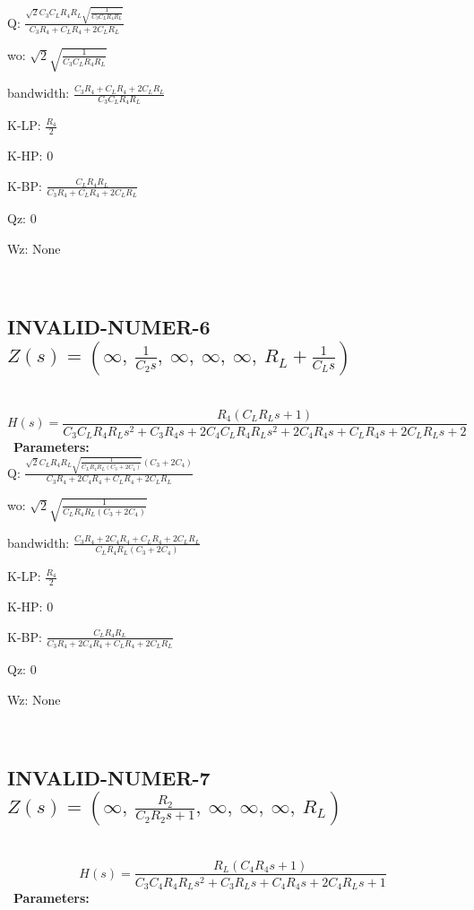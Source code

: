 \documentclass{article}
\begin{document}
Q: $\frac{\sqrt{2} C_{3} C_{L} R_{4} R_{L} \sqrt{\frac{1}{C_{3} C_{L} R_{4} R_{L}}}}{C_{3} R_{4} + C_{L} R_{4} + 2 C_{L} R_{L}}$\ 

wo: $\sqrt{2} \sqrt{\frac{1}{C_{3} C_{L} R_{4} R_{L}}}$\ 

bandwidth: $\frac{C_{3} R_{4} + C_{L} R_{4} + 2 C_{L} R_{L}}{C_{3} C_{L} R_{4} R_{L}}$\ 

K-LP: $\frac{R_{4}}{2}$\ 

K-HP: $0$\ 

K-BP: $\frac{C_{L} R_{4} R_{L}}{C_{3} R_{4} + C_{L} R_{4} + 2 C_{L} R_{L}}$\ 

Qz: $0$\ 

Wz: $\text{None}$\ 

\ 

\subsection{INVALID-NUMER-6 $Z(s) = \left( \infty, \  \frac{1}{C_{2} s}, \  \infty, \  \infty, \  \infty, \  R_{L} + \frac{1}{C_{L} s}\right)$ } \ 
\textbf{\[H(s) = \frac{R_{4} \left(C_{L} R_{L} s + 1\right)}{C_{3} C_{L} R_{4} R_{L} s^{2} + C_{3} R_{4} s + 2 C_{4} C_{L} R_{4} R_{L} s^{2} + 2 C_{4} R_{4} s + C_{L} R_{4} s + 2 C_{L} R_{L} s + 2}\] } \ 
\textbf{Parameters:}\\ 

Q: $\frac{\sqrt{2} C_{L} R_{4} R_{L} \sqrt{\frac{1}{C_{L} R_{4} R_{L} \left(C_{3} + 2 C_{4}\right)}} \left(C_{3} + 2 C_{4}\right)}{C_{3} R_{4} + 2 C_{4} R_{4} + C_{L} R_{4} + 2 C_{L} R_{L}}$\ 

wo: $\sqrt{2} \sqrt{\frac{1}{C_{L} R_{4} R_{L} \left(C_{3} + 2 C_{4}\right)}}$\ 

bandwidth: $\frac{C_{3} R_{4} + 2 C_{4} R_{4} + C_{L} R_{4} + 2 C_{L} R_{L}}{C_{L} R_{4} R_{L} \left(C_{3} + 2 C_{4}\right)}$\ 

K-LP: $\frac{R_{4}}{2}$\ 

K-HP: $0$\ 

K-BP: $\frac{C_{L} R_{4} R_{L}}{C_{3} R_{4} + 2 C_{4} R_{4} + C_{L} R_{4} + 2 C_{L} R_{L}}$\ 

Qz: $0$\ 

Wz: $\text{None}$\ 

\ 

\subsection{INVALID-NUMER-7 $Z(s) = \left( \infty, \  \frac{R_{2}}{C_{2} R_{2} s + 1}, \  \infty, \  \infty, \  \infty, \  R_{L}\right)$ } \ 
\textbf{\[H(s) = \frac{R_{L} \left(C_{4} R_{4} s + 1\right)}{C_{3} C_{4} R_{4} R_{L} s^{2} + C_{3} R_{L} s + C_{4} R_{4} s + 2 C_{4} R_{L} s + 1}\] } \ 
\textbf{Parameters:}\\ 
\end{document}
